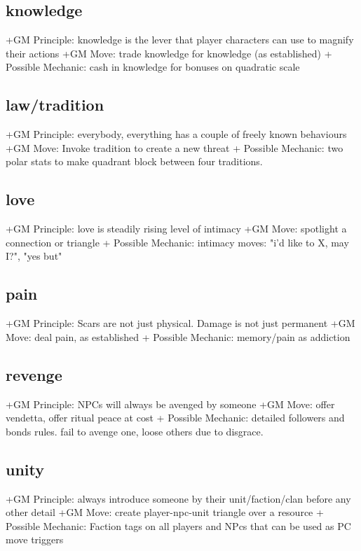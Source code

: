 \documentclass{tufte-handout}
\begin{document}
\subsection{knowledge }
+GM Principle: knowledge is the lever that player characters can use to magnify their actions	
+GM Move: trade knowledge for knowledge (as established)
+ Possible Mechanic: cash in knowledge for bonuses on quadratic scale

\subsection{law/tradition}
+GM Principle: everybody, everything has a couple of freely known behaviours
+GM Move: Invoke tradition to create a new threat
+ Possible Mechanic: two polar stats to make quadrant block between four traditions. 

\subsection{love}
+GM Principle:  love is steadily rising level of intimacy
+GM Move: spotlight a connection or triangle
+ Possible Mechanic: intimacy moves: 	 "i'd like to X, may I?", "yes but"

\subsection{pain}
+GM Principle: Scars are not just physical. Damage is not just permanent
+GM Move: deal pain, as established
+ Possible Mechanic: memory/pain as addiction 

\subsection{revenge}

+GM Principle: NPCs will always be avenged by someone
+GM Move:  offer vendetta, offer ritual peace at cost
+ Possible Mechanic: detailed followers and bonds rules. fail to avenge one, loose others due to disgrace.

\subsection{unity}
+GM Principle: always introduce someone by their unit/faction/clan before any other detail	
+GM Move: create player-npc-unit triangle over a resource 	
+ Possible Mechanic: Faction tags on all players and NPcs that can be used as PC move triggers
\end{document}
